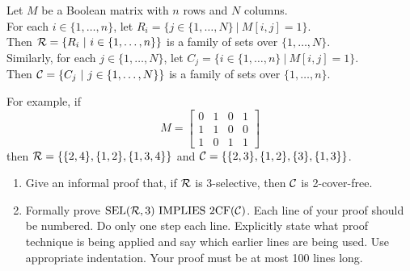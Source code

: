 \documentclass[11pt]{article}
\newcommand{\Implies}{\mbox{ IMPLIES }}
\newcounter{ind}
\begin{document}
\begin{question}
Let $M$ be a Boolean matrix with $n$ rows and $N$ columns.\\
For each $i \in \{1,\ldots,n\}$, let $R_i = \{ j \in \{1,\ldots,N\} \ |\
M[i,j] = 1\}$.\\
Then ${\cal R} = \{ R_i \ |\ i \in \{1,\ldots,n\}\}$ is a family
of sets over $\{1,\ldots,N\}$.\\
Similarly, for each $j \in \{1,\ldots,N\}$, let $C_j = \{ i \in \{1,\ldots,n\} \ |\
M[i,j] = 1\}$.\\
Then ${\cal C} = \{ C_j \ |\ j \in \{1,\ldots,N\}\}$ is a family
of sets over $\{1,\ldots,n\}$.

For example, if
$$M = \left [
\begin{array}{cccc}
0 & 1 & 0 & 1\\
1 & 1 & 0 & 0\\
1 & 0 & 1 & 1
\end{array}
\right ]$$
then ${\cal R} = \{\{2,4\}, \{1,2\}, \{1,3,4\}\}$ and
${\cal C} = \{\{2,3\}, \{1,2\}, \{3\}, \{1,3\}\}$.
\end{question}

\begin{enumerate}
\item
\begin{question}
Give an informal proof that, if $\cal R$ is 3-selective, then $\cal C$ is 2-cover-free.
\end{question}

\begin{solution}
\end{solution}

\item
\begin{question}
Formally prove  ${\rm SEL}({\cal R},3) \Implies {\rm 2CF}({\cal C})$.
Each line of your proof should be numbered.
Do only one step each line.
Explicitly state what proof technique is being
applied and say which earlier lines are being used.
Use appropriate indentation. Your proof must be at most 100 lines long.
\end{question}

\begin{solution}

\end{solution}
\end{enumerate}
\end{document}
